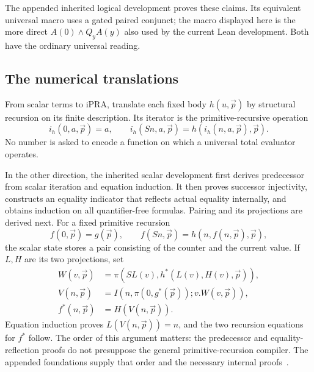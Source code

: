 The appended inherited logical development proves these claims. Its
equivalent universal macro uses a gated paired conjunct; the macro displayed
here is the more direct $A(0)\wedge Q_yA(y)$ also used by the current
Lean development. Both have the ordinary universal reading.

\subsection{The numerical translations}

From scalar terms to iPRA, translate each fixed body $h(u,\vec p)$ by
structural recursion on its finite description. Its iterator is the
primitive-recursive operation
\[
 i_h(0,a,\vec p)=a,\qquad
 i_h(Sn,a,\vec p)=h(i_h(n,a,\vec p),\vec p).
\]
No number is asked to encode a function on which a universal total
evaluator operates.

In the other direction, the inherited scalar development first derives
predecessor from scalar iteration and equation induction. It then proves
successor injectivity, constructs an equality indicator that reflects
actual equality internally, and obtains induction on all quantifier-free
formulas. Pairing and its projections are derived next. For a fixed
primitive recursion
\[
 f(0,\vec p)=g(\vec p),\qquad
 f(Sn,\vec p)=h(n,f(n,\vec p),\vec p),
\]
the scalar state stores a pair consisting of the counter and the current
value. If $L,H$ are its two projections, set
\[
\begin{aligned}
 W(v,\vec p)&=\pi(SL(v),h^*(L(v),H(v),\vec p)),\\
 V(n,\vec p)&=I(n,\pi(0,g^*(\vec p));v.W(v,\vec p)),\\
 f^*(n,\vec p)&=H(V(n,\vec p)).
\end{aligned}
\]
Equation induction proves $L(V(n,\vec p))=n$, and the two recursion
equations for $f^*$ follow. The order of this argument matters: the
predecessor and equality-reflection proofs do not presuppose the general
primitive-recursion compiler. The appended foundations supply that order
and the necessary internal proofs~\cite{choice,bridge,erasure,forward,progress}.


